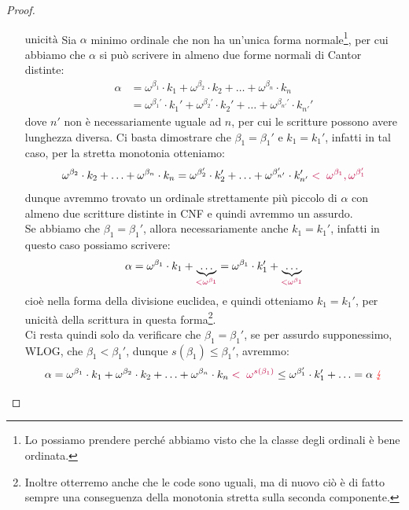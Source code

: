\begin{proof}
\begin{itemize}
\[			\]
		e affinché la disuguaglianza sia vera il sup al RHS deve essere ben definito, e lo è a condizione che l'insieme di ordinali su cui è preso è non vuoto, ovvero a condizione che esista $\delta < \gamma$ tale che $\alpha < \omega^\delta$, contro la minimalità di $\gamma$.\footnote{Come al
		solito si può osservare alternativamente anche che la disuguaglianza $\omega^\delta \leq \alpha$, valida per la minimalità di $\gamma$, passa al sup generando ancora una volta un assurdo.}
		\item[$\boxed{\text{unicità}}$] Sia $\alpha$ minimo ordinale che non ha un'unica forma normale\footnote{Lo possiamo prendere perché abbiamo visto che la classe degli ordinali è bene ordinata.}, per cui abbiamo che $\alpha$ si può scrivere in almeno due forme normali di Cantor distinte:
		\[ \begin{split}
			\alpha &= \omega^{\beta_1} \cdot k_1 + \omega^{\beta_2} \cdot k_2 + \ldots + \omega^{\beta_n} \cdot k_n \\
				   &= \omega^{\beta_1'} \cdot k_1' + \omega^{\beta_2'} \cdot k_2' + \ldots + \omega^{\beta_{n'}'} \cdot k_{n'}'
		\end{split}
			\]
		dove $n'$ non è necessariamente uguale ad $n$, per cui le scritture possono avere lunghezza diversa.
		Ci basta dimostrare che $\beta_1 = \beta_1'$ e $k_1 = k_1'$, infatti in tal caso, per la stretta monotonia otteniamo:
		\[ \omega^{\beta_2} \cdot k_2 + \ldots + \omega^{\beta_n} \cdot k_n = \omega^{\beta_2'} \cdot k_2' + \ldots + \omega^{\beta_{n'}'} \cdot k_{n'}' \;\textcolor{purple}{<\;\omega^{\beta_1},\omega^{\beta_1'}} 
			\]
		dunque avremmo trovato un ordinale strettamente più piccolo di $\alpha$ con almeno due scritture distinte in CNF e quindi avremmo un assurdo.\\
		Se abbiamo che $\beta_1 = \beta_1'$, allora necessariamente anche $k_1 = k_1'$, infatti in questo caso possiamo scrivere:
		\[ \alpha = \omega^{\beta_1} \cdot k_1 + \underbrace{\ldots}_{\textcolor{purple}{< \omega^{\beta_1}}} = \omega^{\beta_1} \cdot k_1' + \underbrace{\ldots}_{\textcolor{purple}{< \omega^{\beta_1}}}
			\]
		cioè nella forma della divisione euclidea, e quindi otteniamo $k_1 = k_1'$, per unicità della scrittura in questa forma\footnote{Inoltre otterremo anche che le code sono uguali, ma di nuovo ciò è di fatto sempre una conseguenza della monotonia stretta sulla seconda componente.}.\\
		Ci resta quindi solo da verificare che $\beta_1 = \beta_1'$, se per assurdo supponessimo, WLOG, che $\beta_1 < \beta_1'$, dunque $s(\beta_1) \leq \beta_1'$, avremmo:
		\[ \alpha = \omega^{\beta_1} \cdot k_1 + \omega^{\beta_2} \cdot k_2 + \ldots + \omega^{\beta_n} \cdot k_n \; \textcolor{purple}{<\; \omega^{s(\beta_1)}} \leq \omega^{\beta_1'} \cdot k_1' + \ldots = \alpha \; \textcolor{red}\lightning
			\]
	\end{itemize}
\end{proof}

